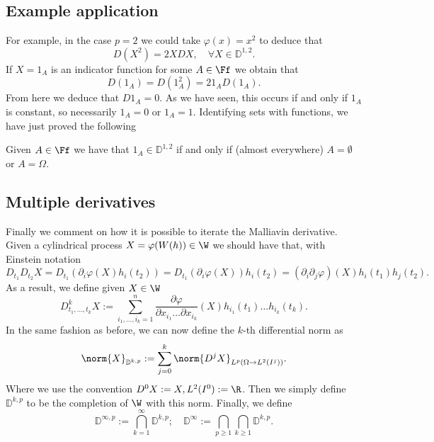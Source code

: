 \documentclass[
    a4paper,
    DIV=14,
    abstract=true,
    numbers=noenddot
]{scrartcl}
\begin{document}
\subsection{Example application}
For example, in the case $p=2$ we could take $\varphi(x)=x^2$ to deduce that
\begin{equation*}
	D(X^2)=2XDX,\quad\forall X\in \mathbb{D}^{1,2}.
\end{equation*}
If $X=1_A$ is an indicator function for some  $A\in \Ff$ we obtain that
\begin{equation*}
	D(1_A)=D(1_A^2)=21_AD(1_A).
\end{equation*}
From here we deduce that $D1_A=0$. As we have seen, this occurs if and only if $1_A$ is constant, so necessarily  $1_A=0$ or  $1_A=1$. Identifying sets with functions, we have just proved the following
\begin{corollary}
	Given $A\in \Ff$ we have that $1_A\in \mathbb{D}^{1,2}$ if and only if (almost everywhere) $A=\emptyset$ or $A=\Omega$.
\end{corollary}


\subsection{Multiple derivatives}
Finally we comment on how it is possible to iterate the Malliavin derivative. Given a cylindrical process $X=\varphi(W(h))\in \W$ we should have that, with Einstein notation
\begin{equation*}
	D_{t_1}D_{t_2}X=D_{t_1}(\partial_i \varphi(X)h_i(t_2))=D_{t_1}(\partial_i \varphi(X))h_i(t_2)=(\partial_i\partial _j \varphi)(X)h_i(t_1)h_j(t_2).
\end{equation*}
As a result, we define given $X\in \W$
\begin{equation*}
	D^k_{t_1,\ldots,t_k} X:= \sum_{i_1,\ldots,i_k=1}^{n}  \frac{\partial \varphi}{\partial x_{i_1}\ldots\partial x_{i_k}}(X)h_{i_1}(t_1)\ldots h_{i_k}(t_k) .
\end{equation*}
In the same fashion as before, we can now define the $k$-th differential norm as
\begin{equation*}
	\norm{X}_{\mathbb{D}^{k,p}}:=\sum_{j=0}^{k}  \norm{D^j X}_{L^p(\Omega\to L^2(I^j))}.
\end{equation*}
Where we use the convention $D^0 X:=X, L^2(I^0):= \R$. Then we simply define $\mathbb{D}^{k,p}$ to be the completion of $\W$ with this norm. Finally, we define
\begin{equation*}
	\mathbb{D}^{\infty,p}:= \bigcap_{k=1}^\infty \mathbb{D}^{k,p};\quad \mathbb{D}^\infty := \bigcap_{p \geq 1} \bigcap_{k \geq 1} \mathbb{D}^{k,p}.
\end{equation*}

\end{document}
